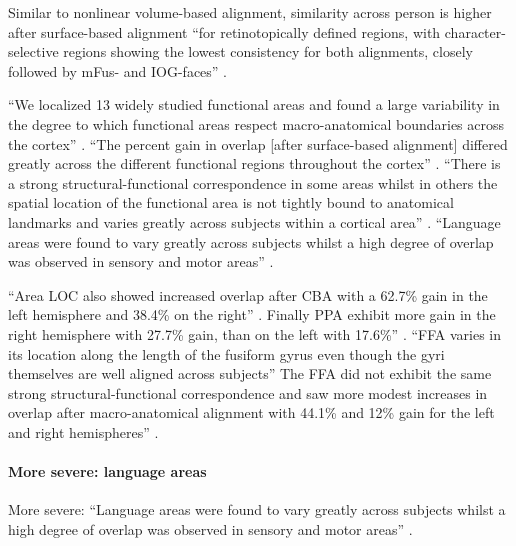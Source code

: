 Similar to nonlinear volume-based alignment, similarity across person is higher
after surface-based alignment ``for retinotopically defined regions, with
character-selective regions showing the lowest consistency for both alignments,
closely followed by mFus- and IOG-faces'' \citep{rosenke2021probabilistic}.

%
``We localized 13 widely studied functional areas and found a large variability
in the degree to which functional areas respect macro-anatomical boundaries
across the cortex'' \citep{frost2012measuring}.
%
``The percent gain in overlap [after surface-based alignment] differed greatly
across the different functional regions throughout the cortex''
\citep{frost2012measuring}.
%
``There is a strong structural-functional correspondence in some areas whilst in
others the spatial location of the functional area is not tightly bound to
anatomical landmarks and varies greatly across subjects within a cortical area''
\citep{frost2012measuring}.
%
``Language areas were found to vary greatly across subjects whilst a high degree
of overlap was observed in sensory and motor areas'' \citep{frost2012measuring}.

%
``Area LOC also showed increased overlap after CBA with a 62.7\% gain in the
left hemisphere and 38.4\% on the right'' \citep{frost2012measuring}.
%
Finally PPA exhibit more gain in the right hemisphere with 27.7\% gain, than on
the left with 17.6\%'' \citep{frost2012measuring}.
%
``FFA varies in its location along the length of the fusiform gyrus even though
the gyri themselves are well aligned across subjects''
%
The FFA did not exhibit the same strong structural-functional correspondence and
saw more modest increases in overlap after macro-anatomical alignment with
44.1\% and 12\% gain for the left and right hemispheres''
\citep{frost2012measuring}.



\paragraph{More severe: language areas}


%
More severe: ``Language areas were found to vary greatly across subjects whilst
a high degree of overlap was observed in sensory and motor areas''
\citep{frost2012measuring}.



